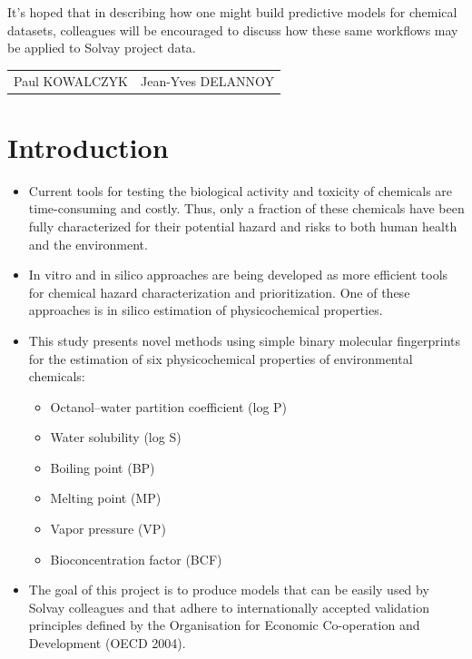 \documentclass[10pt, letter]{report}
\renewcommand{\=}{\, =\, }
\newcommand{\+}{\, +\, }
\renewcommand{\-}{\, -\, }
\begin{document}
It's hoped that in describing how one might build predictive models for chemical datasets, colleagues will be encouraged to discuss how these same workflows may be applied to Solvay project data.


\vspace*{1cm}
\begin{tabular*}{5.03\textwidth}{lr}
Paul KOWALCZYK &\hspace*{9cm} Jean-Yves DELANNOY\\
\end{tabular*}

\tableofcontents


\chapter{Introduction}

\begin{itemize}
\item Current tools for testing the biological activity and toxicity of chemicals are
time-consuming and costly. Thus, only a fraction of these chemicals have been
fully characterized for their potential hazard and risks to both human health and
the environment.
\item In vitro and in silico approaches are being developed as more efficient tools for
chemical hazard characterization and prioritization. One of these approaches is in
silico estimation of physicochemical properties.
\item This study presents novel methods using simple binary molecular fingerprints for
the estimation of six physicochemical properties of environmental chemicals:
\begin{itemize}
\item Octanol–water partition coefficient (log P)
\item Water solubility (log S)
\item Boiling point (BP)
\item Melting point (MP)
\item Vapor pressure (VP)
\item Bioconcentration factor (BCF)
\end{itemize}
\item The goal of this project is to produce models that can be easily used by Solvay colleagues and that adhere to
internationally accepted validation principles defined by the Organisation for
Economic Co-operation and Development (OECD 2004).
\end{itemize}
\end{document}
